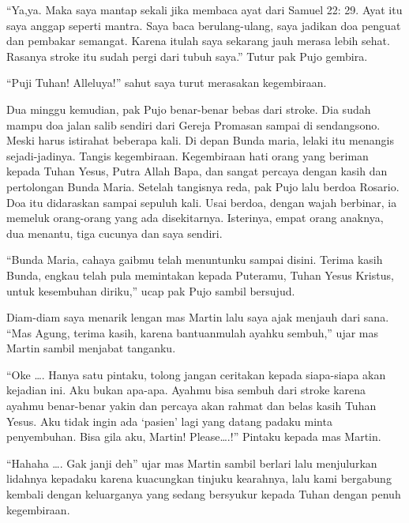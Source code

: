 	“Ya,ya. Maka saya mantap sekali jika membaca ayat dari Samuel 22: 29. Ayat itu saya anggap seperti mantra. Saya baca berulang-ulang, saya jadikan doa penguat dan pembakar semangat. Karena itulah saya sekarang jauh merasa lebih sehat. Rasanya stroke itu sudah pergi dari tubuh saya.” Tutur pak Pujo gembira.

	“Puji Tuhan! Alleluya!” sahut saya turut merasakan kegembiraan.

	Dua minggu kemudian, pak Pujo benar-benar bebas dari stroke. Dia sudah mampu doa jalan salib sendiri dari Gereja Promasan sampai di sendangsono. Meski harus istirahat beberapa kali. Di depan Bunda maria, lelaki itu menangis sejadi-jadinya. Tangis kegembiraan. Kegembiraan hati orang yang beriman kepada Tuhan Yesus, Putra Allah Bapa, dan sangat percaya dengan kasih dan pertolongan Bunda Maria. Setelah tangisnya reda, pak Pujo lalu berdoa Rosario. Doa itu didaraskan sampai sepuluh kali. Usai berdoa, dengan wajah berbinar, ia memeluk orang-orang yang ada disekitarnya. Isterinya, empat orang anaknya, dua menantu, tiga cucunya dan saya sendiri.

	“Bunda Maria, cahaya gaibmu telah menuntunku sampai disini. Terima kasih Bunda, engkau telah pula memintakan kepada Puteramu, Tuhan Yesus Kristus, untuk kesembuhan diriku,” ucap pak Pujo sambil bersujud.

	Diam-diam saya menarik lengan mas Martin lalu saya ajak menjauh dari sana.  “Mas Agung, terima kasih, karena bantuanmulah ayahku sembuh,” ujar mas Martin sambil menjabat tanganku. 

	“Oke \ldots. Hanya satu pintaku, tolong jangan ceritakan kepada siapa-siapa akan kejadian ini. Aku bukan apa-apa. Ayahmu bisa sembuh dari stroke karena ayahmu benar-benar yakin dan percaya akan rahmat dan belas kasih Tuhan Yesus.  Aku tidak ingin ada ‘pasien’ lagi yang datang padaku minta penyembuhan. Bisa gila aku, Martin! Please\ldots.!” Pintaku kepada mas Martin.

“Hahaha \ldots. Gak janji deh” ujar mas Martin sambil berlari lalu menjulurkan lidahnya kepadaku  karena kuacungkan tinjuku kearahnya,  lalu kami bergabung kembali dengan keluarganya yang sedang bersyukur kepada Tuhan dengan penuh kegembiraan.
	





  
